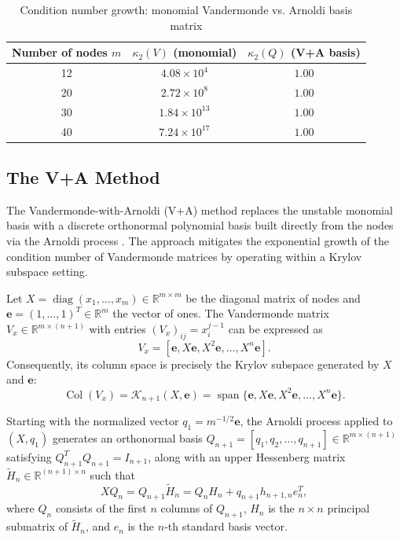 \documentclass[11pt]{article}
\begin{document}
\begin{table}[H]
\centering
\caption{Condition number growth: monomial Vandermonde vs. Arnoldi basis matrix}
\label{tab:condpilot}
\begin{tabular}{ccc}
\toprule
Number of nodes $m$ & $\kappa_2(V)$ (monomial) & $\kappa_2(Q)$ (V+A basis) \\
\midrule
12 & $4.08\times 10^4$ & $1.00$ \\
20 & $2.72\times 10^8$ & $1.00$ \\
30 & $1.84\times 10^{13}$ & $1.00$ \\
40 & $7.24\times 10^{17}$ & $1.00$ \\
\bottomrule
\end{tabular}
\end{table}

\subsection{The V+A Method}

The Vandermonde-with-Arnoldi (V+A) method replaces the unstable monomial basis with a discrete orthonormal polynomial basis built directly from the nodes via the Arnoldi process \cite{brubeck2021vandermonde}. The approach mitigates the
exponential growth of the condition number of Vandermonde matrices by operating within a Krylov subspace setting.

Let $X = \operatorname{diag}(x_1,\dots,x_m) \in \mathbb{R}^{m\times m}$ be the diagonal matrix of nodes and $\mathbf{e} = (1,\dots,1)^T \in \mathbb{R}^m$ the vector of ones. The Vandermonde matrix $V_x \in \mathbb{R}^{m \times (n+1)}$ with entries $(V_x)_{ij} = x_i^{j-1}$ can be expressed as
 $$
V_x = [\mathbf{e}, X\mathbf{e}, X^2\mathbf{e}, \ldots, X^n\mathbf{e}].
 $$
Consequently, its column space is precisely the Krylov subspace generated by $X$ and $\mathbf{e}$:
 $$
\operatorname{Col}(V_x) = \mathcal{K}_{n+1}(X, \mathbf{e}) = \operatorname{span}\{\mathbf{e}, X\mathbf{e}, X^2\mathbf{e}, \ldots, X^n\mathbf{e}\}.
 $$

Starting with the normalized vector $q_1 = m^{-1/2}\mathbf{e}$, the Arnoldi process applied to $(X, q_1)$ generates an orthonormal basis $Q_{n+1} = [q_1, q_2, \ldots, q_{n+1}] \in \mathbb{R}^{m \times (n+1)}$ satisfying $Q_{n+1}^T Q_{n+1} = I_{n+1}$, along with an upper Hessenberg matrix $\tilde{H}_n \in \mathbb{R}^{(n+1) \times n}$ such that
\begin{equation}
X Q_n = Q_{n+1} \tilde{H}_n = Q_n H_n + q_{n+1} h_{n+1,n} e_n^T, \label{eq:arnoldi_relation}
\end{equation}
where $Q_n$ consists of the first $n$ columns of $Q_{n+1}$, $H_n$ is the $n \times n$ principal submatrix of $\tilde{H}_n$, and $e_n$ is the $n$-th standard basis vector.
\end{document}
